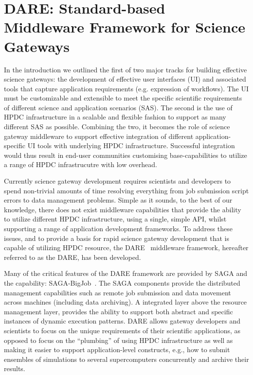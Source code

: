\documentclass[]{svjour3}
\begin{document}
\section{DARE: Standard-based Middleware Framework for Science
  Gateways}

In the introduction we outlined the first of two major tracks for
building effective science gateways: the development of effective user
interfaces (UI) and associated tools that capture application
requirements (e.g. expression of workflows).  The UI must be
customizable and extensible to meet the specific scientific
requirements of different science and application scenarios (SAS).
The second is the use of HPDC infrastructure in a scalable and
flexible fashion to support as many different SAS as possible.
Combining the two, it becomes the role of science gateway middleware
to support effective integration of different application-specific UI
tools with underlying HPDC infrastructure. Successful integration
would thus result in end-user communities customising
base-capabilities to utilize a range of HPDC infrastrucutre with low
overhead.

Currently science gateway development requires scientists and
developers to spend non-trivial amounts of time resolving everything
from job submission script errors to data management problems. Simple
as it sounds, to the best of our knowledge, there does not exist
middleware capabilities that provide the ability to utilize different
HPDC infrastructure, using a single, simple API, whilst supporting a
range of application development frameworks.  To address these
issues, and to provide a basis for rapid science gateway development
that is capable of utilizing HPDC resource, the DARE~\cite{dareurl}
middleware framework, hereafter referred to as the DARE, has been
developed.

Many of the critical features of the DARE framework are provided by
SAGA and the \pilotjob capability:
SAGA-BigJob~\cite{saga_bigjob_condor_cloud}.  The SAGA components
provide the distributed management capabilities such as remote job
submission and data movement across machines (including data
archiving).  A integrated layer above the resource management layer,
provides the ability to support both abstract and specific instances
of dynamic execution patterns.  DARE allows gateway developers and
scientists to focus on the unique requirements of their scientific
applications, as opposed to focus on the ``plumbing'' of using HPDC
infrastructure as well as making it easier to support
application-level constructs, e.g., how to submit ensembles of
simulations to several supercomputers concurrently and archive their
results.
\end{document}
